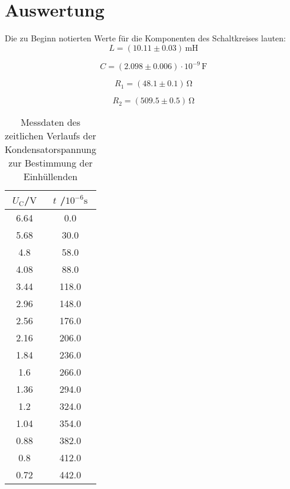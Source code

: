\section{Auswertung}
\label{sec:Auswertung}
Die zu Beginn notierten Werte für die Komponenten des Schaltkreises lauten:
\begin{equation*}
	L=(10.11 \pm 0.03) \,\si{\milli\henry}
\end{equation*}

\begin{equation*}
	C=(2.098 \pm 0.006) \cdot 10^{-9} \, \si{\farad}
\end{equation*}

\begin{equation*}
	R_\text{1}= (48.1 \pm 0.1) \, \si{\ohm}
\end{equation*}

\begin{equation*}
	R_\text{2}= (509.5\pm 0.5)\,\si{\ohm}
\end{equation*}



\begin{table}
	\caption{Messdaten des zeitlichen Verlaufs der Kondensatorspannung zur Bestimmung der Einhüllenden}
	\label{tab:messung1}
	\centering
	\begin{tabular}{cc}
		\toprule
		$U_\text{C}$/$\si{\volt}$ & $t$ /$10^{-6}\si{\second}$ \\
		\midrule
		6.64                      & 0.0                        \\
		5.68                      & 30.0                       \\
		4.8                       & 58.0                       \\
		4.08                      & 88.0                       \\
		3.44                      & 118.0                      \\
		2.96                      & 148.0                      \\
		2.56                      & 176.0                      \\
		2.16                      & 206.0                      \\
		1.84                      & 236.0                      \\
		1.6                       & 266.0                      \\
		1.36                      & 294.0                      \\
		1.2                       & 324.0                      \\
		1.04                      & 354.0                      \\
		0.88                      & 382.0                      \\
		0.8                       & 412.0                      \\
		0.72                      & 442.0                      \\
		\bottomrule
	\end{tabular}
\end{table}

